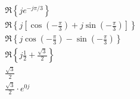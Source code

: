 \documentclass{zc-ust-hw}
\begin{document}
\begin{enumerate}
\begin{sol}
\begin{gather}
        \mathfrak{R}\left\{je^{-j\pi/3}\right\} \\
        \mathfrak{R}\left\{j \left[ \cos \left( -\frac{\pi}{3} \right) +j\sin \left( -\frac{\pi}{3} \right)  \right] \right\} \\
        \mathfrak{R}\left\{j\cos \left( -\frac{\pi}{3} \right) -\sin \left( -\frac{\pi}{3} \right)  \right\} \\
        \mathfrak{R}\left\{j \frac{1}{2} + \frac{\sqrt{3} }{2}   \right\} \\
        \boxed{
          \frac{\sqrt{3}}{2}
        } \\
        \boxed{
          \frac{\sqrt{3}}{2} \cdot e^{0j} 
        }
      \end{gather}
    \end{sol}
\end{enumerate}
\end{document}
